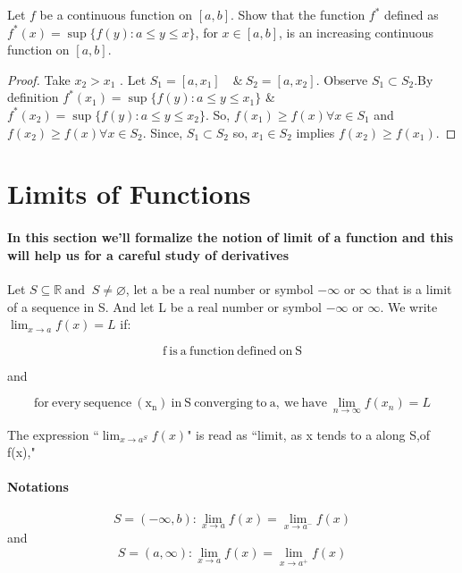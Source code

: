 \documentclass{notes}
\begin{document}
\begin{problem}     
	 Let $f$ be a continuous function on $[a, b]$. Show that the function $f^{*}$ defined as 
	 $f^{*}(x) = \sup \{f(y) : a \leq y \leq x\}$, for $x \in [a, b]$, is an increasing
	 continuous function on $[a, b]$. 
\end{problem}
\begin{proof}
	Take $x_2 > x_1$ . Let $S_1 = [a,x_1]\quad\&\ S_2 = [a,x_2]$. Observe $S_1 \subset S_2$.By definition $f^{*}(x_1) = \sup \{f(y) : a \leq y \leq x_1\} $ \& $f^{*}(x_2) = \sup \{f(y) : a \leq y \leq x_2\}$. So, $f(x_1) \geq f(x) \forall x \in S_1$ and $f(x_2) \geq f(x) \forall x \in S_2$. Since, $S_1 \subset S_2$ so, $x_1 \in S_2$ implies $f(x_2) \geq f(x_1)$.
\end{proof}

\section{Limits of Functions}
\paragraph*{In this section we'll formalize the notion of limit of a function and this will help us for a careful study of derivatives}
\begin{definition}{}
	Let $S \subseteq \mathbb{R}\ \text{and }\ S \not = \varnothing$, let a be a real number or symbol $ - \infty$ or $\infty$ that is a limit of a sequence in S. And let L be a real number or symbol  $ - \infty$ or $\infty$. We write $\lim_{x \to a} f(x) = L$ if:
	
	$$ \mathrm{f\ is\ a\ function\ defined\ on\ S}$$
	
	and 
	
	$$ \mathrm{for\ every\ sequence\ (x_n)\ in\ S\ converging\ to\ a,\ we\ have }\ \lim_{n \to \infty} f(x_n) = L$$
	
	The expression ``$\lim_{x \to a^S} f(x)$" is read as ``limit, as x tends to a along S,of f(x),"
	
	
\end{definition}
\paragraph{Notations} 
$$ S = (-\infty,b): 
\lim_{x \to  a} f(x) = \lim_{x \to  a^{ - }} f(x)$$
and
$$ S = (a,\infty): \lim_{x \to  a} f(x) = \lim_{x \to  a^{ + }} f(x)$$
\end{document}
